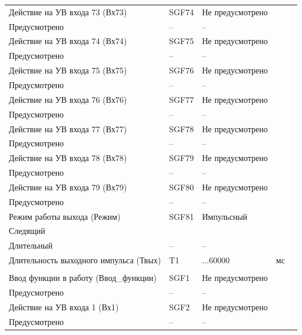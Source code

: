 \begin{longtable}{|>{\centering\arraybackslash}m{5.3cm}|>{\centering\arraybackslash}m{3.3cm}|>{\centering\arraybackslash}m{4.2cm}|>{\centering\arraybackslash}m{1.8cm}|>{\centering\arraybackslash}m{1cm}|}
\hline
\centering Действие на УВ входа 73 (Вх73)  & \centering SGF74 & \centering Не предусмотрено \\ Предусмотрено & \centering -- & \centering \arraybackslash -- \\
\hline
\centering Действие на УВ входа 74 (Вх74)  & \centering SGF75 & \centering Не предусмотрено \\ Предусмотрено & \centering -- & \centering \arraybackslash -- \\
\hline
\centering Действие на УВ входа 75 (Вх75)  & \centering SGF76 & \centering Не предусмотрено \\ Предусмотрено & \centering -- & \centering \arraybackslash -- \\
\hline
\centering Действие на УВ входа 76 (Вх76)  & \centering SGF77 & \centering Не предусмотрено \\ Предусмотрено & \centering -- & \centering \arraybackslash -- \\
\hline
\centering Действие на УВ входа 77 (Вх77)  & \centering SGF78 & \centering Не предусмотрено \\ Предусмотрено & \centering -- & \centering \arraybackslash -- \\
\hline
\centering Действие на УВ входа 78 (Вх78)  & \centering SGF79 & \centering Не предусмотрено \\ Предусмотрено & \centering -- & \centering \arraybackslash -- \\
\hline
\centering Действие на УВ входа 79 (Вх79)  & \centering SGF80 & \centering Не предусмотрено \\ Предусмотрено & \centering -- & \centering \arraybackslash -- \\
\hline
\centering Режим работы выхода (Режим)  & \centering SGF81 & \centering Импульсный \\ Следящий \\ Длительный & \centering -- & \centering \arraybackslash -- \\
\hline
\centering Длительность выходного импульса (Твых)  & \centering T1 & \centering 50...60000 & \centering мс & \centering \arraybackslash 10 \\
\hline
\multicolumn{5}{|c|}{ УВ4 } \\ \hline 
\centering Ввод функции в работу (Ввод\_функции)  & \centering SGF1 & \centering Не предусмотрено \\ Предусмотрено & \centering -- & \centering \arraybackslash -- \\
\hline
\centering Действие на УВ входа 1 (Вх1)  & \centering SGF2 & \centering Не предусмотрено \\ Предусмотрено & \centering -- & \centering \arraybackslash -- \\

\end{longtable}

